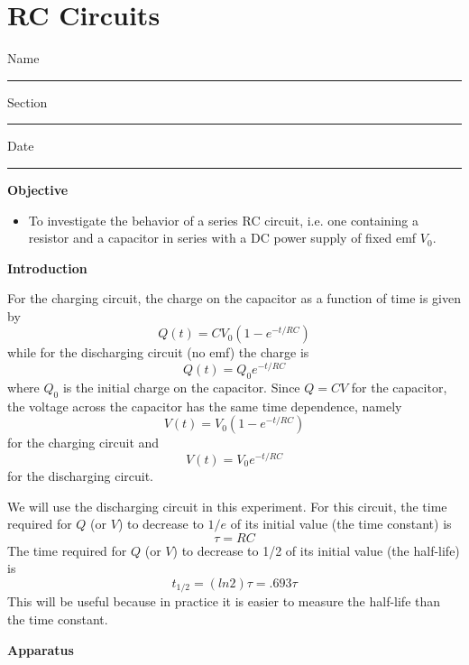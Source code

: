 \setcounter{equation}{0}

\section{RC Circuits}

Name \rule{2.0in}{0.1pt}\hfill{}Section \rule{1.0in}{0.1pt}\hfill{}Date
\rule{1.0in}{0.1pt}

\textbf{Objective}

\begin{itemize}
\item To investigate the behavior of a series RC circuit, i.e. one containing a resistor and a capacitor in series with a DC power supply of fixed emf $V_{0}$.
\end{itemize}
\textbf{Introduction} 

For the charging circuit, the charge on the capacitor as a function of time
is given by
\begin{equation}
Q(t)=CV_{0}\left(1-e^{-t/RC}\right)
\end{equation}
while for the discharging circuit (no emf) the charge is
\begin{equation}
Q(t)=Q_{0}e^{-t/RC}
\end{equation}
where $Q_{0}$ is the initial charge on the capacitor.  Since $Q=CV$ for the
capacitor, the voltage across the capacitor has the same time dependence,
namely
\begin{equation}
V(t)=V_{0}\left(1-e^{-t/RC}\right)
\end{equation}
for the charging circuit and
\begin{equation}
V(t)=V_{0}e^{-t/RC}
\end{equation}
for the discharging circuit.
\vspace{5mm}

We will use the discharging circuit in this experiment.
For this circuit, the time required for $Q$ (or $V$) to decrease to
$1/e$ of its initial value (the time constant) is
\begin{equation}
\tau=RC
\end{equation}
The time required for $Q$ (or $V$) to decrease to 1/2 of its initial value (the
half-life) is
\begin{equation}
t_{1/2}=(ln2)\tau =.693\tau
\end{equation}
This will be useful because in practice it is easier to measure the half-life
than the time constant.


\textbf{Apparatus}


